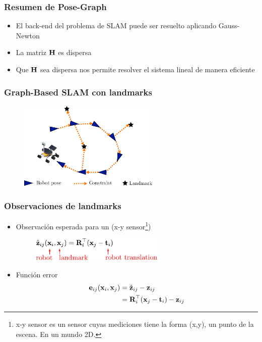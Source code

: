 \begin{frame}
    \frametitle{Resumen de Pose-Graph}
    
    \begin{itemize}
        \item El back-end del problema de SLAM puede ser resuelto aplicando Gauss-Newton
        \item La matriz $\boldsymbol{\mathbf{H}}$ es dispersa
        \item Que $\boldsymbol{\mathbf{H}}$ sea dispersa nos permite resolver el sistema lineal de manera eficiente
    \end{itemize}
    
\end{frame}

\begin{frame}
    \frametitle{Graph-Based SLAM con landmarks}
    
   	\begin{figure}[!h]
        \includegraphics[width=0.6\textwidth]{images/pose_landmark_graph_example.pdf}
    \end{figure}
    
\end{frame}

\begin{frame}
    \frametitle{Observaciones de landmarks}
    
    \begin{itemize}
		\item Observación esperada para un (x-y sensor\footnote{x-y sensor es un sensor cuyas mediciones tiene la forma (x,y), un punto de la escena. En un mundo 2D.})
   		\begin{figure}[!h]
			\includegraphics[width=0.6\textwidth]{images/pose_landmark_graph_expected_observation.pdf}
		\end{figure}
	\item Función error
	\begin{align*}
		\boldsymbol{\mathbf{e}}_{ij}(\boldsymbol{\mathbf{x}}_{i}, \boldsymbol{\mathbf{x}}_{j}) &= \hat{\boldsymbol{\mathbf{z}}}_{ij} - \boldsymbol{\mathbf{z}}_{ij}\\
					&= \boldsymbol{\mathbf{R}}_{i}^{\top}(\boldsymbol{\mathbf{x}}_{j}-\boldsymbol{\mathbf{t}}_{i}) - \boldsymbol{\mathbf{z}}_{ij}
	\end{align*}
    \end{itemize}
    
\end{frame}

